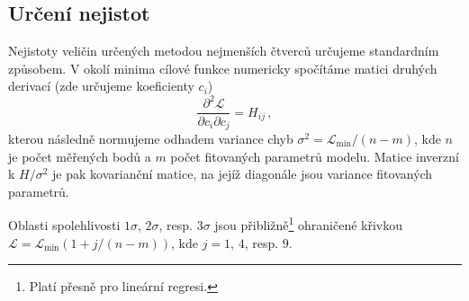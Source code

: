 \subsection*{Určení nejistot}

Nejistoty veličin určených metodou nejmenších čtverců určujeme standardním způsobem\cite{gelmanBayesianDataAnalysis2014}.
V okolí minima cílové funkce numericky spočítáme matici druhých derivací (zde určujeme koeficienty $c_i$)
\begin{equation}
    \frac{\partial^2 \mathcal{L}}{\partial c_i \partial c_j} = H_{ij} \,,
\end{equation}
kterou následně normujeme odhadem variance chyb $\sigma^2 = \mathcal{L}_\textrm{min}/(n-m)$, kde $n$ je počet měřených bodů a $m$ počet fitovaných parametrů modelu.
Matice inverzní k $H/\sigma^2$ je pak kovarianční matice, na jejíž diagonále jsou variance fitovaných parametrů.

Oblasti spolehlivosti $1\sigma$, $2\sigma$, resp. $3\sigma$ jsou přibližně\footnote{Platí přesně pro lineární regresi.} ohraničené křivkou $\mathcal{L}=\mathcal{L}_\textrm{min}(1+j/(n-m))$, kde $j=1$, $4$, resp. $9$.

